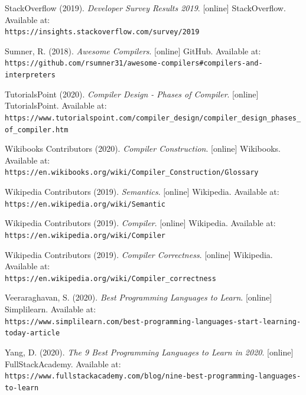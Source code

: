 \documentclass[
]{report}
\begin{document}
\begin{thebibliography}{24}
	StackOverflow (2019).
	\textit{Developer Survey Results 2019}.
	[online] StackOverflow. Available at:
	\\\texttt{https://insights.stackoverflow.com/survey/2019}
	
	Sumner, R. (2018).
	\textit{Awesome Compilers}.
	[online] GitHub. Available at:
	\\\texttt{https://github.com/rsumner31/awesome-compilers\#compilers-and-interpreters}
	
	TutorialsPoint (2020).
	\textit{Compiler Design - Phases of Compiler}.
	[online] TutorialsPoint. Available at:
	\\\texttt{https://www.tutorialspoint.com/compiler\_design/compiler\_design\_phases\_of\_compiler.htm}
	
	Wikibooks Contributors (2020).
	\textit{Compiler Construction}.
	[online] Wikibooks. Available at:
	\\\texttt{https://en.wikibooks.org/wiki/Compiler\_Construction/Glossary}
	
	Wikipedia Contributors (2019).
	\textit{Semantics}.
	[online] Wikipedia. Available at:
	\\\texttt{https://en.wikipedia.org/wiki/Semantic}
	
	Wikipedia Contributors (2019).
	\textit{Compiler}.
	[online] Wikipedia. Available at:
	\\\texttt{https://en.wikipedia.org/wiki/Compiler}
	
	Wikipedia Contributors (2019).
	\textit{Compiler Correctness}.
	[online] Wikipedia. Available at:
	\\\texttt{https://en.wikipedia.org/wiki/Compiler\_correctness}
	
	Veeraraghavan, S. (2020).
	\textit{Best Programming Languages to Learn}.
	[online] Simplilearn. Available at:
	\\\texttt{https://www.simplilearn.com/best-programming-languages-start-learning-today-article}
	
	Yang, D. (2020).
	\textit{The 9 Best Programming Languages to Learn in 2020}.
	[online] FullStackAcademy. Available at:
	\\\texttt{https://www.fullstackacademy.com/blog/nine-best-programming-languages-to-learn}

\end{thebibliography}
\end{document}
